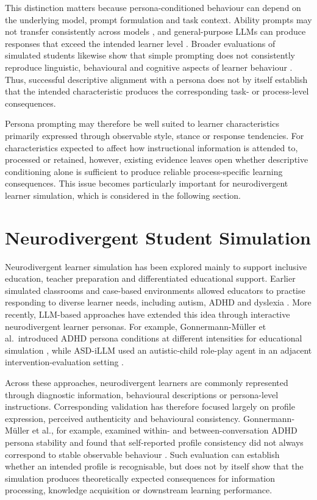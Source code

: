This distinction matters because persona-conditioned behaviour can depend on the underlying model, prompt formulation and task context. Ability prompts may not transfer consistently across models \cite{benedetto-etal-2024-using}, and general-purpose LLMs can produce responses that exceed the intended learner level \cite{wu-etal-2025-embracing}. Broader evaluations of simulated students likewise show that simple prompting does not consistently reproduce linguistic, behavioural and cognitive aspects of learner behaviour \cite{scarlatos-etal-2026-simulated}. Thus, successful descriptive alignment with a persona does not by itself establish that the intended characteristic produces the corresponding task- or process-level consequences.

Persona prompting may therefore be well suited to learner characteristics primarily expressed through observable style, stance or response tendencies. For characteristics expected to affect how instructional information is attended to, processed or retained, however, existing evidence leaves open whether descriptive conditioning alone is sufficient to produce reliable process-specific learning consequences. This issue becomes particularly important for neurodivergent learner simulation, which is considered in the following section.

\section{Neurodivergent Student Simulation}
\label{sec:nd-student-simulation}

Neurodivergent learner simulation has been explored mainly to support inclusive education, teacher preparation and differentiated educational support. Earlier simulated classrooms and case-based environments allowed educators to practise responding to diverse learner needs, including autism, ADHD and dyslexia \cite{rayner-fluck-2014-simschool,bichler-etal-2024-diagnostic}. More recently, LLM-based approaches have extended this idea through interactive neurodivergent learner personas. For example, Gonnermann-Müller et al.~introduced ADHD persona conditions at different intensities for educational simulation \cite{gonnermann-muller-etal-2026-adhd-persona}, while ASD-iLLM used an autistic-child role-play agent in an adjacent intervention-evaluation setting \cite{lai-etal-2025-asd}.

Across these approaches, neurodivergent learners are commonly represented through diagnostic information, behavioural descriptions or persona-level instructions. Corresponding validation has therefore focused largely on profile expression, perceived authenticity and behavioural consistency. Gonnermann-Müller et al., for example, examined within- and between-conversation ADHD persona stability and found that self-reported profile consistency did not always correspond to stable observable behaviour \cite{gonnermann-muller-etal-2026-adhd-persona}. Such evaluation can establish whether an intended profile is recognisable, but does not by itself show that the simulation produces theoretically expected consequences for information processing, knowledge acquisition or downstream learning performance.


